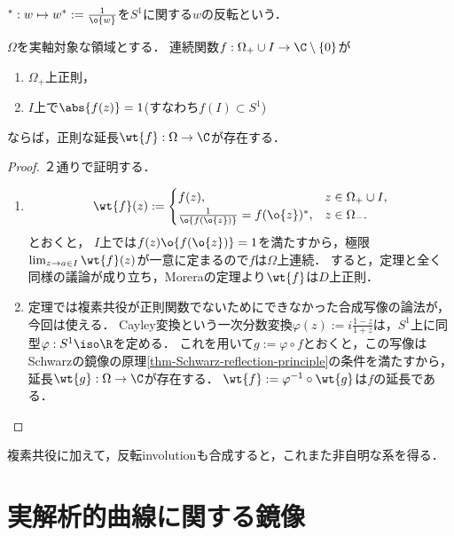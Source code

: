 \documentclass[uplatex, dvipdfmx]{jsreport}
\begin{document}
\begin{notation}
    ${}^*:w\mapsto w^*:=\frac{1}{\o{w}}$を$S^1$に関する$w$の反転という．
\end{notation}

\begin{corollary}\label{cor-reflection-principle-about-circle}
    $\Omega$を実軸対象な領域とする．
    連続関数$f:\Omega_+\cup I\to\C\setminus\{0\}$が
    \begin{enumerate}
        \item $\Omega_+$上正則，
        \item $I$上で$\abs{f(z)}=1$(すなわち$f(I)\subset S^1$)
    \end{enumerate}
    ならば，正則な延長$\wt{f}:\Omega\to\C$が存在する．
\end{corollary}
\begin{proof}
    ２通りで証明する．
    \begin{enumerate}
        \item \[\wt{f}(z):=\begin{cases}
            f(z),&z\in\Omega_+\cup I,\\
            \frac{1}{\o{f(\o{z})}}=f(\o{z})^*,&z\in\Omega_-.
        \end{cases}\]
        とおくと，
        $I$上では$f(z)\o{f(\o{z})}=1$を満たすから，極限$\lim_{z\to a\in I}\wt{f}(z)$が一意に定まるので$f$は$\Omega$上連続．
        すると，定理と全く同様の議論が成り立ち，Moreraの定理より$\wt{f}$は$D$上正則．
        \item 定理では複素共役が正則関数でないためにできなかった合成写像の論法が，今回は使える．
        Cayley変換という一次分数変換$\varphi(z):=i\frac{1-z}{1+z}$は，$S^1$上に同型$\varphi:S^1\iso\R$を定める．
        これを用いて$g:=\varphi\circ f$とおくと，この写像はSchwarzの鏡像の原理\ref{thm-Schwarz-reflection-principle}の条件を満たすから，延長$\wt{g}:\Omega\to\C$が存在する．
        $\wt{f}:=\varphi^{-1}\circ\wt{g}$は$f$の延長である．
    \end{enumerate}
\end{proof}
\begin{remarks}
    複素共役に加えて，反転involutionも合成すると，これまた非自明な系を得る．
\end{remarks}

\section{実解析的曲線に関する鏡像}
\end{document}
